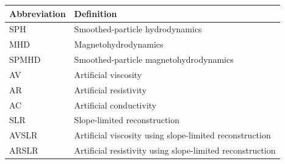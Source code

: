 
\begin{table}[h]
\setlength{\abovecaptionskip}{6pt}%
\centering
\begin{tabular}{@{}ll@{}}
\toprule
Abbreviation & Definition \\
\midrule
SPH & Smoothed-particle hydrodynamics \\
MHD & Magnetohydrodynamics \\
SPMHD & Smoothed-particle magnetohydrodynamics \\
AV & Artificial viscosity \\
AR & Artificial resistivity \\
AC & Artificial conductivity \\
SLR & Slope-limited reconstruction \\
AVSLR & Artificial viscosity using slope-limited reconstruction \\
ARSLR & Artificial resistivity using slope-limited reconstruction \\
\bottomrule
\end{tabular}
\end{table}